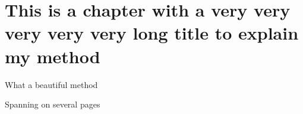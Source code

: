 \chapter[Short tile for table of content]{This is a chapter with a very very very very very long title to explain my method}
\label{chap:methods}
\minitoc

What a beautiful method

\newpage

Spanning on several pages